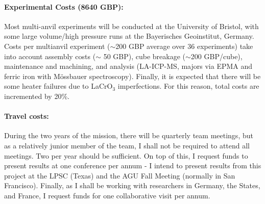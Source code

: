 \documentclass[11pt,twoside,a4paper]{article}
\begin{document}
\paragraph{Experimental Costs (8640 GBP):} Most multi-anvil experiments will be conducted at the University of Bristol, with some large volume/high pressure runs at the Bayerisches Geoinstitut, Germany. Costs per multianvil experiment ($\sim$200 GBP average over 36 experiments) take into account assembly costs ($\sim$ 50 GBP), cube breakage ($\sim$200 GBP/cube), maintenance and machining, and analysis (LA-ICP-MS, majors via EPMA and ferric iron with M\"{o}ssbauer spectroscopy). Finally, it is expected that there will be some heater failures due to LaCrO$_3$ imperfections. For this reason, total costs are incremented by 20\%.
\vspace{-1.2em}
\paragraph{Travel costs:} During the two years of the mission, there will be quarterly team meetings, but as a relatively junior member of the team, I shall not be required to attend all meetings. Two per year should be sufficient. On top of this, I request funds to present results at one conference per annum - I intend to present results from this project at the LPSC (Texas) and the AGU Fall Meeting (normally in San Francisco). Finally, as I shall be working with researchers in Germany, the States, and France, I request funds for one collaborative visit per annum. 


\clearpage

\end{document}
